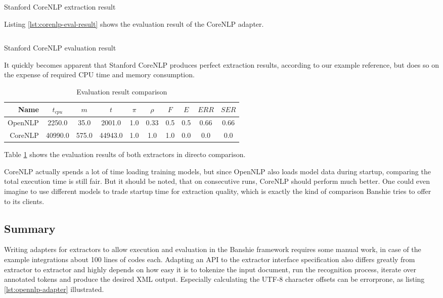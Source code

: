 \begin{listing}[H]
\inputminted{xml}{corenlp.xml}
\caption{Stanford CoreNLP extraction result}
\label{lst:corenlp-result}
\end{listing}

\newpage
Listing \ref{lst:corenlp-eval-result} shows the evaluation result of the CoreNLP adapter.

\begin{listing}[H]
\inputminted{java}{corenlp.txt}
\caption{Stanford CoreNLP evaluation result}
\label{lst:corenlp-eval-result}
\end{listing}

It quickly becomes apparent that Stanford CoreNLP produces perfect extraction results, according to our example reference, but does so on the expense of required CPU time and memory consumption. 

\begin{table}[H]
\centering
\begin{tabular*}{\textwidth}{rccccccccc}
	\toprule
	Name & $t_{cpu}$ & $m$ & $t$ & $\pi$ & $\rho$ & $F$ & $E$ & $ERR$ & $SER$ \\
	\midrule
	OpenNLP & 2250.0 & 35.0 & 2001.0 & 1.0 & 0.33 & 0.5 & 0.5 & 0.66 & 0.66 \\ 
	CoreNLP & 40990.0 & 575.0 & 44943.0 & 1.0 & 1.0 & 1.0 & 0.0 & 0.0 & 0.0 \\
	\bottomrule
\end{tabular*}
\caption{Evaluation result comparison}
\label{tbl:result-comparison}
\end{table}

Table \ref{tbl:result-comparison} shows the evaluation results of both extractors in directo comparison.

CoreNLP actually spends a lot of time loading training models, but since OpenNLP also loads model data during startup, comparing the total execution time is still fair. But it should be noted, that on consecutive runs, CoreNLP should perform much better. One could even imagine to use different models to trade startup time for extraction quality, which is exactly the kind of comparison Banshie tries to offer to its clients.

\newpage
\subsection{Summary}
Writing adapters for extractors to allow execution and evaluation in the Banshie framework requires some manual work, in case of the example integrations about 100 lines of codes each. Adapting an \gls{API} to the extractor interface specification also differs greatly from extractor to extractor and highly depends on how easy it is to tokenize the input document, run the recognition process, iterate over annotated tokens and produce the desired \gls{XML} output. Especially calculating the UTF-8 character offsets can be errorprone, as listing \ref{lst:opennlp-adapter} illustrated.

